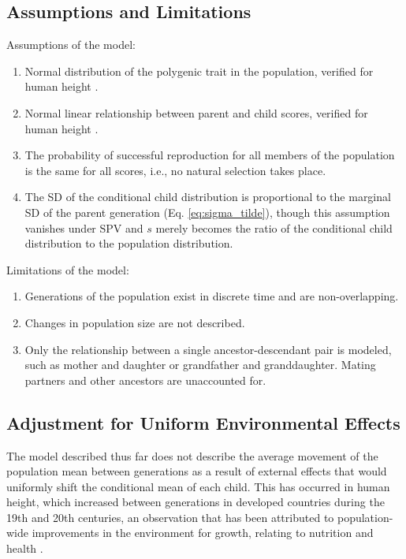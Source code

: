 \documentclass{svproc} %
\begin{document}
\subsection{Assumptions and Limitations} \label{al}

Assumptions of the model:
\begin{enumerate}
\item Normal distribution of the polygenic trait in the population, verified for human height \cite{preece}. 
\item Normal linear relationship between parent and child scores, verified for human height \cite{luo}. 
\item The probability of successful reproduction for all members of the population is the same for all scores, i.e., no natural selection takes place.
\item The SD of the conditional child distribution is proportional to the marginal SD of the parent generation (Eq. \ref{eq:sigma_tilde}), though this assumption vanishes under SPV and $s$ merely becomes the ratio of the conditional child distribution to the population distribution. 
\end{enumerate}
Limitations of the model:
\begin{enumerate}
\item Generations of the population exist in discrete time and are non-overlapping.
\item Changes in population size are not described. 
\item Only the relationship between a single ancestor-descendant pair is modeled, such as mother and daughter or grandfather and granddaughter. Mating partners and other ancestors are unaccounted for. 
\end{enumerate}

\subsection{Adjustment for Uniform Environmental Effects} \label{adjustment}

The model described thus far does not describe the average movement of the population mean between generations as a result of external effects that would uniformly shift the conditional mean of each child. This has occurred in human height, which increased between generations in developed countries during the 19th and 20th centuries, an observation that has been attributed to population-wide improvements in the environment for growth, relating to nutrition and health \cite{bogin, perkins}. 
\end{document}
